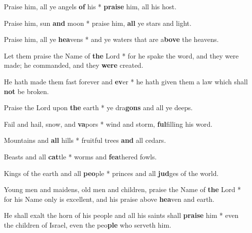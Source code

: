 \begin{multicols}{2}
	Praise him, all ye angels \textbf{of} his * \textbf{praise} him, all his host.
	
	Praise him, sun \textbf{and} moon * praise him, \textbf{all} ye stars and light.
	
	Praise him, all ye \textbf{hea}vens * and ye waters that are a\textbf{bove} the heavens.
	
	Let them praise the Name of \textbf{the} Lord * for he spake the word, and they were made; he commanded, and they \textbf{were} created.
	
	He hath made them fast forever and \textbf{ev}er * he hath given them a law which shall \textbf{not} be broken.
	
	Praise the Lord upon \textbf{the} earth * ye dra\textbf{gons} and all ye deeps.
	
	Fail and hail, snow, and \textbf{va}pors * wind and storm, \textbf{ful}filling his word.
	
	Mountains and \textbf{all} hills * fruitful trees \textbf{and} all cedars.
	
	Beasts and all \textbf{cat}tle * worms and \textbf{fea}thered fowls.
	
	Kings of the earth and all \textbf{peo}ple * princes and all \textbf{jud}ges of the world.
	
	Young men and maidens, old men and children, praise the Name of \textbf{the} Lord * for his Name only is excellent, and his praise above \textbf{hea}ven and earth.
	
	He shall exalt the horn of his people and all his saints shall \textbf{praise} him * even the children of Israel, even the peo\textbf{ple} who serveth him.
\end{multicols}
